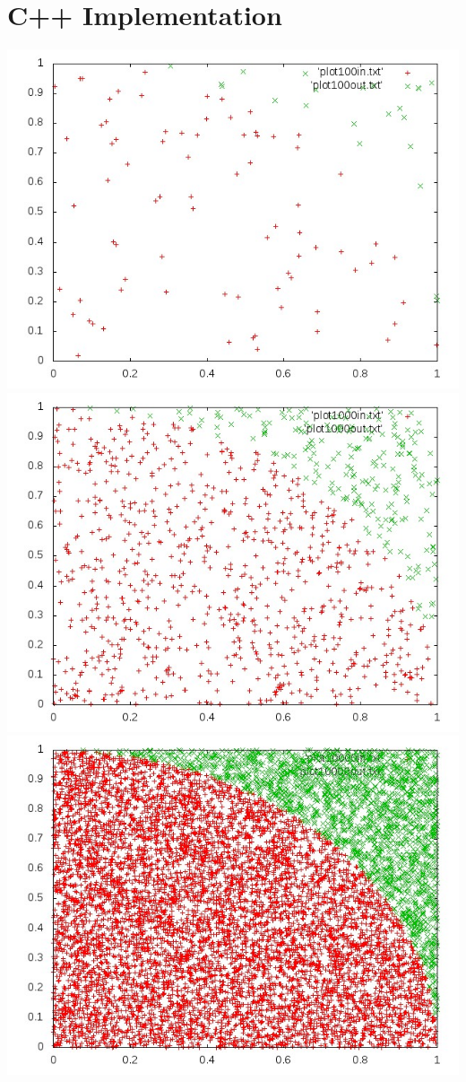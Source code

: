 \documentclass[11pt]{article}
\begin{document}
\section{C++ Implementation}

\includegraphics{plot100.jpg}
\includegraphics{plot1000.jpg}
\includegraphics{plot10000.jpg}
\end{document}
